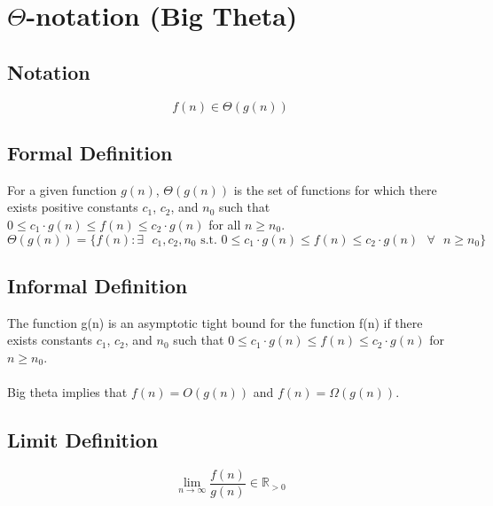 \section{$\Theta$-notation (Big Theta)}

\subsection*{Notation}
$$
f(n) \in \Theta(g(n))
$$

\subsection*{Formal Definition}
For a given function $g(n)$, $\Theta(g(n))$ is the set of functions for which there exists positive constants $c_1$, $c_2$, and $n_0$ such that $0 \leq c_1 \cdot g(n) \leq f(n) \leq c_2 \cdot g(n)$ for all $n \geq n_0$.
$$
\Theta(g(n)) = \{ f(n) : \exists \text{ } c_1, c_2, n_0 \text{ s.t. } 0 \leq c_1 \cdot g(n) \leq f(n) \leq c_2 \cdot g(n) \text{ } \forall \text{ } n \geq n_0 \}
$$

\subsection*{Informal Definition}
The function g(n) is an asymptotic tight bound for the function f(n) if there exists constants $c_1$, $c_2$, and $n_0$ such that $0 \leq c_1 \cdot g(n) \leq f(n) \leq c_2 \cdot g(n)$ for $n \geq n_0$.\\\\
Big theta implies that $f(n) = O(g(n))$ and $f(n) = \Omega(g(n))$.

\subsection*{Limit Definition}
$$
\lim\limits_{n\to\infty} \frac{f(n)}{g(n)} \in \mathbb{R}_{>0}
$$